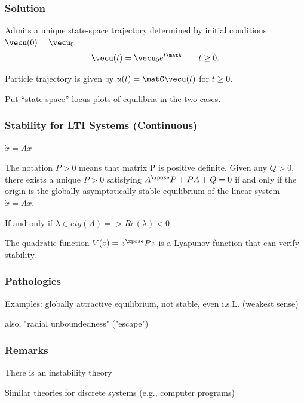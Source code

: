 \documentclass[12pt]{beamer}
\begin{document}
\begin{frame}
\frametitle{Solution}

\begin{itemize}

\vitem Admits a unique state-space trajectory determined by initial conditions $\vecu(0) = \vecu_0$
\[
  \vecu(t) = \vecu_0 e^{t \matA }
  \qquad t \geq 0.
\]

\vitem Particle trajectory is given by $u(t) = \matC \vecu(t)$ for $t \geq 0$.

\end{itemize}
\vfill\null

\end{frame}




\begin{frame}
Put ``state-space'' locus plots of equilibria in the two cases.
\end{frame}





\begin{frame}
\frametitle{Stability for LTI Systems (Continuous)}


$\dot x = Ax$

The notation $P > 0$ means that matrix P is positive definite.
Given any $Q > 0$, there exists a unique $P > 0$ satisfying 
$A^\xpose P + P A + Q = 0$ if and only if the origin is the globally asymptotically stable equilibrium of the linear system $\dot x = A x$.

If and only if $\lambda \in eig(A) => Re(\lambda) < 0$

The quadratic function $V(z) = z^\xpose P z$ is a Lyapunov function that can verify stability.

\end{frame}



\begin{frame}
\frametitle{Pathologies}

Examples: globally attractive equilibrium, not stable, even i.s.L. (weakest sense)

also, "radial unboundedness" ("escape")

\end{frame}








\begin{frame}
\frametitle{Remarks}

There is an instability theory


Similar theories for discrete systems (e.g., computer programs)

\end{frame}
\end{document}
